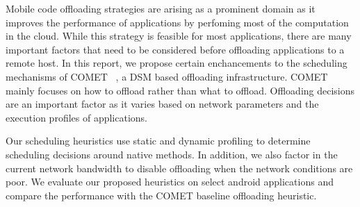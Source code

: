 \vspace{2mm}
Mobile code offloading strategies are arising as a prominent domain as it improves the performance of
applications by perfoming most of the computation in the cloud. While this strategy is feasible for most
applications, there are many important factors that need to be considered before offloading applications
to a remote host. In this report, we propose certain enchancements to the scheduling mechanisms of COMET
~\cite{comet},
a DSM based offloading infrastructure. COMET mainly focuses on how to offload rather than what to offload.
Offloading decisions are an important factor as it varies based on network parameters and the execution
profiles of applications.

Our scheduling heuristics use static and dynamic profiling to determine scheduling decisions around native
methods. In addition, we also factor in the current network bandwidth to disable offloading when the network
conditions are poor. We evaluate our proposed heuristics on select android applications and compare the
performance with the COMET baseline offloading heuristic.
